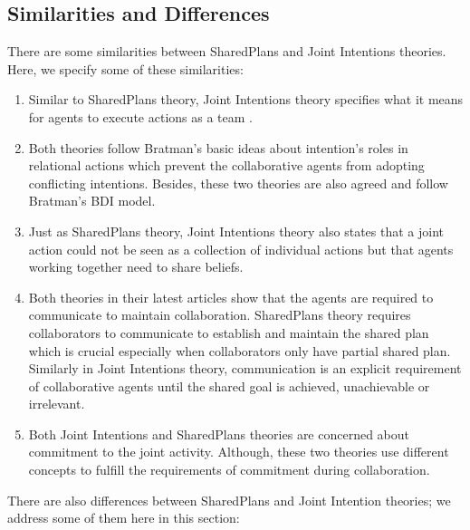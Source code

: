 \documentclass[12pt]{report}
\begin{document}
\subsection{Similarities and Differences}

There are some similarities between SharedPlans and Joint Intentions theories.
Here, we specify some of these similarities:

\begin{enumerate}
  \item Similar to SharedPlans theory, Joint Intentions theory specifies what it
  means for agents to execute actions as a team
  \cite{subramanian:joint-intention-dialogue}.
  
  \item Both theories follow Bratman's basic ideas about intention's roles in
  relational actions which prevent the collaborative agents from adopting
  conflicting intentions. Besides, these two theories are also agreed and follow
  Bratman's BDI model.
  
  \item Just as SharedPlans theory, Joint Intentions theory also states that a
  joint action could not be seen as a collection of individual actions but that
  agents working together need to share beliefs.
  
  \item Both theories in their latest articles show that the agents are required
  to communicate to maintain collaboration. SharedPlans theory requires
  collaborators to communicate to establish and maintain the shared plan which
  is crucial especially when collaborators only have partial shared plan.
  Similarly in Joint Intentions theory, communication is an explicit requirement
  of collaborative agents until the shared goal is achieved, unachievable or
  irrelevant.
  
  \item Both Joint Intentions and SharedPlans theories are concerned about
  commitment to the joint activity. Although, these two theories use different
  concepts to fulfill the requirements of commitment during collaboration.
\end{enumerate}

There are also differences between SharedPlans and Joint Intention theories;
we address some of them here in this section:
\end{document}
